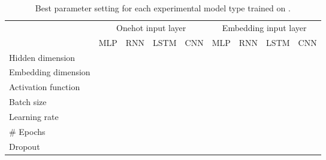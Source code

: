 \begin{table}[]
\centering
\begin{tabular}{lllll|llll}
                    & \multicolumn{4}{c|}{Onehot input layer} & \multicolumn{4}{c}{Embedding input layer}\\
                    & MLP     & RNN     & LSTM     & CNN     & MLP      & RNN      & LSTM      & CNN     \\\hline
Hidden dimension    &         &         &          &         &          &          &           &         \\
Embedding dimension &         &         &          &         &          &          &           &         \\
Activation function &         &         &          &         &          &          &           &         \\
Batch size          &         &         &          &         &          &          &           &         \\
Learning rate       &         &         &          &         &          &          &           &         \\
# Epochs            &         &         &          &         &          &          &           &         \\
Dropout             &         &         &          &         &          &          &           &
\end{tabular}
\caption{Best parameter setting for each experimental model type trained on \citet{Davidson:2017}.}
\label{tab:exp_model_parameters_davidson}
\end{table}

